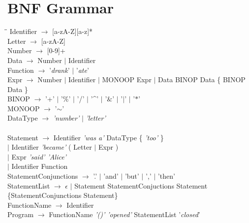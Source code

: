 \documentclass[a4wide, 11pt]{article}
\begin{document}
\section{BNF Grammar}
\label{sec:bnf}
	\begin{tabbing}
	\hspace*{8mm}\=\hspace*{25mm}\=\kill
		\> Identifier $\rightarrow$ [a-zA-Z][a-z]* \\
		\> Letter $\rightarrow$ [a-zA-Z] \\
		\> Number $\rightarrow$ [0-9]+ \\
		\> Data $\rightarrow$ Number $\mid$ Identifier \\
		\> Function $\rightarrow$ '\emph{drank}' $\mid$ '\emph{ate}' \\
		\> Expr	$\rightarrow$ Number $\mid$ Identifier $\mid$ MONOOP Expr 
					$\mid$ Data BINOP Data \{ BINOP Data \}\\
		\> BINOP $\rightarrow$ '+' $\mid$ '$\%$' $\mid$ '/' $\mid$ '\^{ }' 
							$\mid$ '$\&$' $\mid$ '$\mid$' $\mid$ '$\ast$' \\
		\> MONOOP $\rightarrow$ '$\mathtt{\sim}$'\\
		\> DataType $\rightarrow$ \emph{'number'} $\mid$ \emph{'letter'} \\
		\\
		\> Statement $\rightarrow$ Identifier \emph{'was a'} DataType \{ \emph{'too'} \}\\
		\> \> $\mid$ Identifier \emph{'became'} ( Letter $\mid$ Expr ) \\
		\> \>	$\mid$ Expr \emph{'said' 'Alice'} \\
		\> \> $\mid$ Identifier Function \\
		\> StatementConjunctions $\rightarrow$ '.' $\mid$ 'and' $\mid$ 'but' $\mid$ ',' $\mid$ 'then' \\
		\> StatementList $\rightarrow$ $\epsilon$ $\mid$ Statement StatementConjuctions Statement \{StatementConjunctions Statement\} \\
	 	\> FunctionName $\rightarrow$ Identifier \\
		\> Program $\rightarrow$ FunctionName  \emph{'()' 'opened' } StatementList '\emph{closed}'
	\end{tabbing}

\begin{verbatim}
\end{verbatim}
\end{document}
